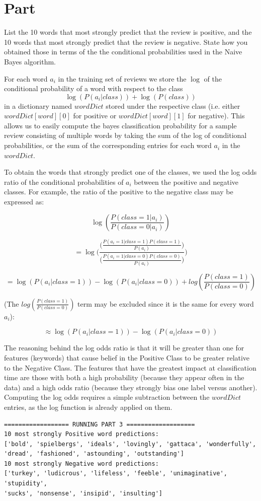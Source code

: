 \documentclass{article}
\newcommand{\enterProblemHeader}[1]{
}
\newcommand{\exitProblemHeader}[1]{
}
\newcounter{homeworkProblemCounter} %
\newcommand{\homeworkProblemName}{}
\newenvironment{homeworkProblem}[1][Part \arabic{homeworkProblemCounter}]{ %
\stepcounter{homeworkProblemCounter} %
\renewcommand{\homeworkProblemName}{#1} %
\section{\homeworkProblemName} %
\enterProblemHeader{\homeworkProblemName} %
}{
\exitProblemHeader{\homeworkProblemName} %
}
\begin{document}
\begin{homeworkProblem}

List the 10 words that most strongly predict that the review is positive, and the 10 words that most strongly predict that the review is negative. State how you obtained those in terms of the the conditional probabilities used in the Naive Bayes algorithm.

For each word $a_{i}$ in the training set of reviews we store the $\log$ of the conditional probability of a word with respect to the class $$\log(P(a_{i} | class)) + \log(P(class))$$ in a dictionary named $wordDict$ stored under the respective class (i.e. either $wordDict[word][0]$ for positive or $wordDict[word][1]$ for negative). This allows us to easily compute the bayes classification probability for a sample review consisting of multiple words by taking the sum of the log of conditional probabilities, or the sum of the corresponding entries for each word $a_{i}$ in the $wordDict$.

To obtain the words that strongly predict one of the classes, we used the log odds ratio of the conditional probabilities of $a_{i}$ between the positive and negative classes. For example, the ratio of the positive to the negative class may be expressed as:

$$\log(\frac{P(class=1 | a_{i})}{P(class=0 | a_{i})})$$

$$ = \log\Big(\frac{\big(\frac{P(a_{i}=1 | class=1) P(class=1)}{P(a_{i})}\big)}{\big(\frac{P(a_{i}=1 | class=0)P(class=0)}{P(a_{i})}\big)}\Big)$$


$$= \log(P(a_{i} | class=1)) - \log(P(a_{i} | class=0)) + log(\frac{P(class=1)}{P(class=0)})$$

(The $log(\frac{P(class=1)}{P(class=0)})$ term may be excluded since it is the same for every word $a_{i}$):

$$\approx \log(P(a_{i} | class=1)) - \log(P(a_{i} | class=0))$$

The reasoning behind the log odds ratio is that it will be greater than one for features (keywords) that cause belief in the Positive Class to be greater relative to the Negative Class. The features that have the greatest impact at classification time are those with both a high probability (because they appear often in the data) and a high odds ratio (because they strongly bias one label versus another). Computing the log odds requires a simple subtraction between the $wordDict$ entries, as the log function is already applied on them.


\begin{verbatim}
================== RUNNING PART 3 ===================
10 most strongly Positive word predictions:
['bold', 'spielbergs', 'ideals', 'lovingly', 'gattaca', 'wonderfully',
'dread', 'fashioned', 'astounding', 'outstanding']
10 most strongly Negative word predictions:
['turkey', 'ludicrous', 'lifeless', 'feeble', 'unimaginative', 'stupidity',
'sucks', 'nonsense', 'insipid', 'insulting']
\end{verbatim}


\end{homeworkProblem}
\end{document}
